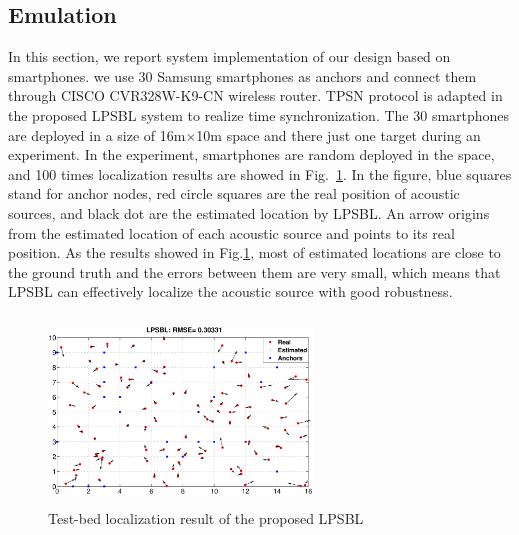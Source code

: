 \subsection{Emulation}


In this section, we report system implementation of our design based on smartphones.
we use 30 Samsung smartphones as anchors and connect them through CISCO CVR328W-K9-CN wireless router. 
TPSN protocol is adapted in the proposed LPSBL system to realize time synchronization.
The 30 smartphones are deployed in a size of 16m$\times$10m space and there just one target during an experiment.
In the experiment, smartphones are random deployed in the space, and 100 times localization results are showed in Fig.~\ref{fig7}. 
In the figure, blue squares stand for anchor
nodes, red circle squares are the real position of acoustic sources, and black dot are the estimated location by LPSBL. 
An arrow origins from the estimated location of each acoustic source and points to its real position. 
As the results showed in Fig.\ref{fig7}, most of estimated locations are close to the ground truth and the errors between them are very small,
which means that LPSBL can effectively localize the acoustic source with good robustness.
  \begin{figure}[htb]
			    \vspace{-12mm}
            \includegraphics[height=5.0cm,width=7.0cm]{image/fig7.eps}
            \vspace{12mm}
            \caption{Test-bed localization result of the proposed LPSBL}
             \vspace{-5mm}
             \label{fig7}
        \end{figure}
